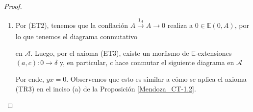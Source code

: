 \documentclass[tesis]{subfiles}
\begin{document}
\begin{proof}\leavevmode

    \begin{enumerate}[label=(\alph*)]
    
        \item Por (ET2), tenemos que la conflación $A\xrightarrow[]{1_A}A\to 0$ realiza a $0\in\mathbb{E}(0,A)$, por lo que tenemos el diagrama conmutativo
            \begin{center}
            \end{center}
            en $\mathscr{A}$. Luego, por el axioma (ET3), existe un morfismo de $\mathbb{E}$-extensiones $(a,c):0\to \delta$ y, en particular, $c$ hace conmutar el siguiente diagrama en $\mathscr{A}$
            \begin{center}
            \end{center}
            Por ende, $yx=0$. Observemos que esto es similar a cómo se aplica el axioma (TR3) en el inciso (a) de la Proposición \ref{Mendoza_CT-1.2}.


\end{enumerate}
\end{proof}
\end{document}
